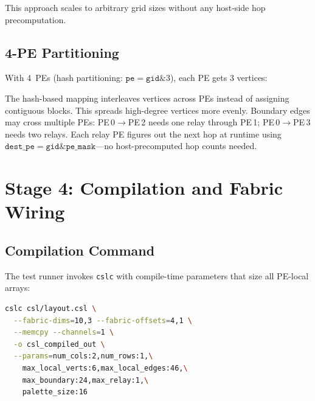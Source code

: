 \documentclass[11pt,letterpaper]{article}
\begin{document}
This approach scales to arbitrary grid sizes without any host-side hop precomputation.

\subsection{4-PE Partitioning}

With 4~PEs (hash partitioning: $\texttt{pe} = \texttt{gid} \mathbin{\&} 3$), each PE gets 3 vertices:

\begin{center}
\end{center}

The hash-based mapping interleaves vertices across PEs instead of assigning contiguous blocks. This spreads high-degree vertices more evenly. Boundary edges may cross multiple PEs: PE\,0$\to$PE\,2 needs one relay through PE\,1; PE\,0$\to$PE\,3 needs two relays. Each relay PE figures out the next hop at runtime using $\texttt{dest\_pe} = \texttt{gid} \mathbin{\&} \texttt{pe\_mask}$---no host-precomputed hop counts needed.

\section{Stage 4: Compilation and Fabric Wiring}
\label{sec:compilation}

\subsection{Compilation Command}

The test runner invokes \texttt{cslc} with compile-time parameters that size all PE-local arrays:

\begin{lstlisting}[numbers=none, language=bash, caption={Compilation command for 2-PE layout}]
cslc csl/layout.csl \
  --fabric-dims=10,3 --fabric-offsets=4,1 \
  --memcpy --channels=1 \
  -o csl_compiled_out \
  --params=num_cols:2,num_rows:1,\
    max_local_verts:6,max_local_edges:46,\
    max_boundary:24,max_relay:1,\
    palette_size:16
\end{lstlisting}
\end{document}
